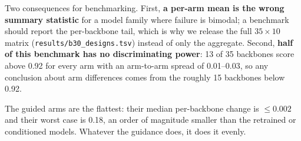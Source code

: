 Two consequences for benchmarking. First, \textbf{a per-arm mean is the wrong
summary statistic} for a model family where failure is bimodal; a benchmark
should report the per-backbone tail, which is why we release the full
$35 \times 10$ matrix (\texttt{results/b30\_designs.tsv}) instead of only the
aggregate. Second, \textbf{half of this benchmark has no discriminating power}:
13 of 35 backbones score above 0.92 for every arm with an arm-to-arm spread of
0.01--0.03, so any conclusion about arm differences comes from the roughly 15
backbones below 0.92.

The guided arms are the flattest: their median per-backbone change is
$\leq 0.002$ and their worst case is 0.18, an order of magnitude smaller than
the retrained or conditioned models. Whatever the guidance does, it does it
evenly.
